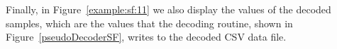 \vspace{+5pt}


\clearpage


Finally, in Figure~\ref{example:sf:11} we also display the values of the decoded samples, which are the values that the decoding routine, shown in Figure~\ref{pseudoDecoderSF}, writes to the decoded CSV data file.


\vspace{+5pt}

